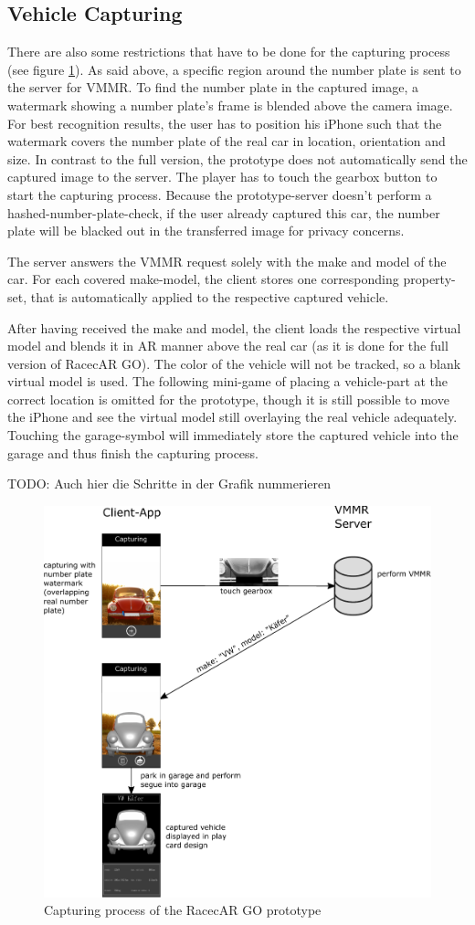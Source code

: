 \subsection{Vehicle Capturing}
There are also some restrictions that have to be done for the capturing process (see figure \ref{fig:capturingLimited}). As said above, a specific region around the number plate is sent to the server for VMMR. To find the number plate in the captured image, a watermark showing a number plate's frame is blended above the camera image. For best recognition results, the user has to position his iPhone such that the watermark covers the number plate of the real car in location, orientation and size. In contrast to the full version, the prototype does not automatically send the captured image to the server. The player has to touch the gearbox button to start the capturing process. Because the prototype-server doesn't perform a hashed-number-plate-check, if the user already captured this car, the number plate will be blacked out in the transferred image for privacy concerns.

The server answers the VMMR request solely with the make and model of the car. For each covered make-model, the client stores one corresponding property-set, that is automatically applied to the respective captured vehicle.

After having received the make and model, the client loads the respective virtual model and blends it in AR manner above the real car (as it is done for the full version of RacecAR GO). The color of the vehicle will not be tracked, so a blank virtual model is used. The following mini-game of placing a vehicle-part at the correct location is omitted for the prototype, though it is still possible to move the iPhone and see the virtual model still overlaying the real vehicle adequately. Touching the garage-symbol will immediately store the captured vehicle into the garage and thus finish the capturing process.

TODO: Auch hier die Schritte in der Grafik nummerieren
\begin{figure}[btph]
  \centering
        \includegraphics[width=.75\linewidth]{gfx/capturing_limited}
        \caption{Capturing process of the RacecAR GO prototype}
        \label{fig:capturingLimited}
\end{figure}

